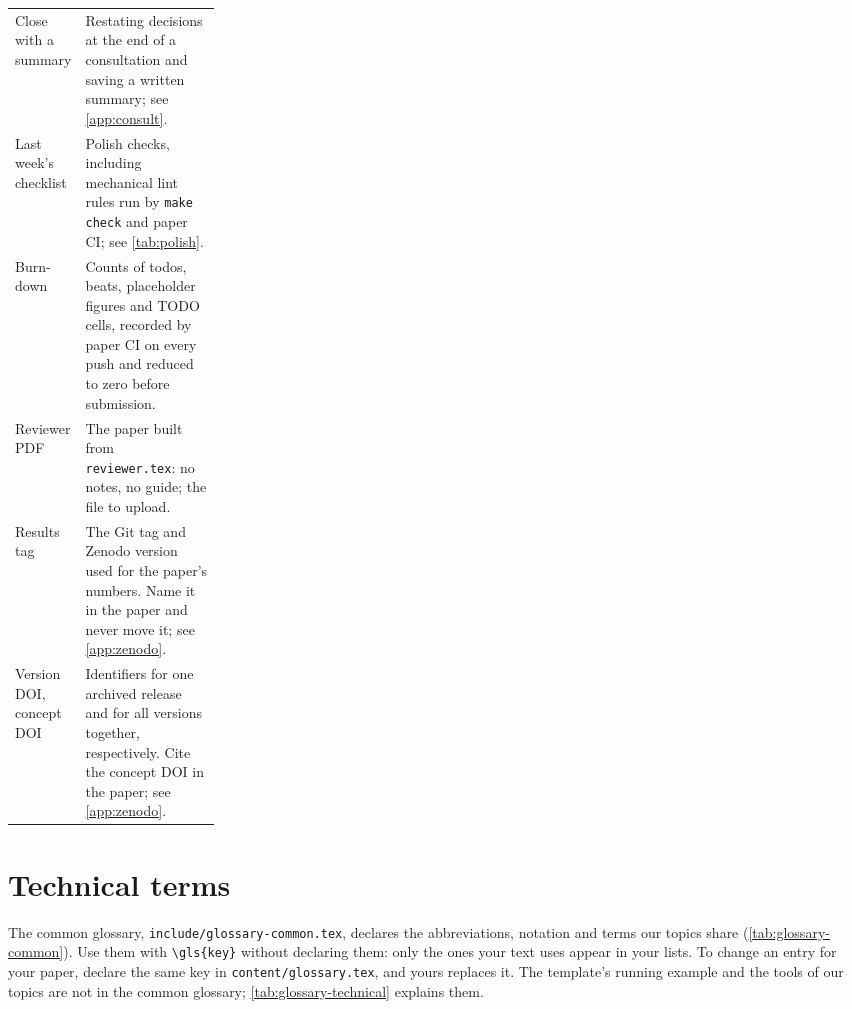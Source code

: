 {\begin{xltabular}{\linewidth}{>{\raggedright\arraybackslash}p{0.24\linewidth} X}
  Close with a summary & Restating decisions at the end of a consultation and saving a written summary; see \cref{app:consult}. \\
  Last week's checklist & Polish checks, including mechanical lint rules run by \texttt{make check} and paper CI; see \cref{tab:polish}. \\
  Burn-down & Counts of todos, beats, placeholder figures and TODO cells, recorded by paper CI on every push and reduced to zero before submission. \\
  Reviewer PDF & The paper built from \texttt{reviewer.tex}: no notes, no guide; the file to upload. \\
  Results tag & The Git tag and Zenodo version used for the paper's numbers. Name it in the paper and never move it; see \cref{app:zenodo}. \\
  Version DOI, concept DOI & Identifiers for one archived release and for all versions together, respectively. Cite the concept DOI in the paper; see \cref{app:zenodo}. \\
\end{xltabular}
}

\section{Technical terms}
The common glossary, \texttt{include/glossary-common.tex}, declares the abbreviations, notation and terms our topics share (\cref{tab:glossary-common}). Use them with \texttt{\textbackslash gls\{key\}} without declaring them: only the ones your text uses appear in your lists. To change an entry for your paper, declare the same key in \texttt{content/glossary.tex}, and yours replaces it. The template's running example and the tools of our topics are not in the common glossary; \cref{tab:glossary-technical} explains them.


